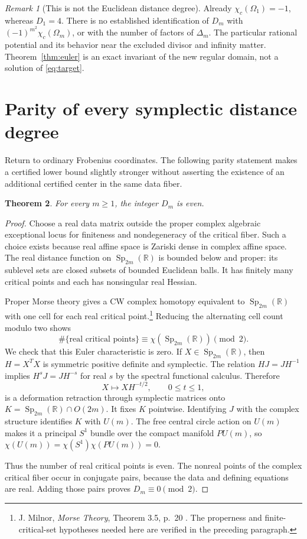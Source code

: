 \documentclass[11pt]{article}
\newtheorem{theorem}{Theorem}[section]
\theoremstyle{remark}\newtheorem{remark}[theorem]{Remark}
\DeclareMathOperator{\Sp}{Sp}
\newcommand{\RR}{\mathbb R}
\begin{document}
\begin{remark}[This is not the Euclidean distance degree]
Already $\chi_c(\Omega_1)=-1$, whereas $D_1=4$. There is no established identification of $D_m$ with $(-1)^{m^2}\chi_c(\Omega_m)$, or with the number of factors of $\Delta_m$. The particular rational potential and its behavior near the excluded divisor and infinity matter. Theorem~\ref{thm:euler} is an exact invariant of the new regular domain, not a solution of \eqref{eq:target}.
\end{remark}

\section{Parity of every symplectic distance degree}\label{sec:parity}
Return to ordinary Frobenius coordinates. The following parity statement makes a certified lower bound slightly stronger without asserting the existence of an additional certified center in the same data fiber.

\begin{theorem}\label{thm:parity}
For every $m\ge1$, the integer $D_m$ is even.
\end{theorem}
\begin{proof}
Choose a real data matrix outside the proper complex algebraic exceptional locus for finiteness and nondegeneracy of the critical fiber. Such a choice exists because real affine space is Zariski dense in complex affine space. The real distance function on $\Sp_{2m}(\RR)$ is bounded below and proper: its sublevel sets are closed subsets of bounded Euclidean balls. It has finitely many critical points and each has nonsingular real Hessian.

Proper Morse theory gives a CW complex homotopy equivalent to $\Sp_{2m}(\RR)$ with one cell for each real critical point.\footnote{J. Milnor, \emph{Morse Theory}, Theorem 3.5, p.~20 \cite{Milnor}. The properness and finite-critical-set hypotheses needed here are verified in the preceding paragraph.} Reducing the alternating cell count modulo two shows
\[
\#\{\text{real critical points}\}\equiv\chi(\Sp_{2m}(\RR))\pmod2.
\]
We check that this Euler characteristic is zero. If $X\in\Sp_{2m}(\RR)$, then $H=X^TX$ is symmetric positive definite and symplectic. The relation $HJ=JH^{-1}$ implies $H^sJ=JH^{-s}$ for real $s$ by the spectral functional calculus. Therefore
\[
X\longmapsto XH^{-t/2},\qquad 0\le t\le1,
\]
is a deformation retraction through symplectic matrices onto $K=\Sp_{2m}(\RR)\cap O(2m)$. It fixes $K$ pointwise. Identifying $J$ with the complex structure identifies $K$ with $U(m)$. The free central circle action on $U(m)$ makes it a principal $S^1$ bundle over the compact manifold $PU(m)$, so $\chi(U(m))=\chi(S^1)\chi(PU(m))=0$.

Thus the number of real critical points is even. The nonreal points of the complex critical fiber occur in conjugate pairs, because the data and defining equations are real. Adding those pairs proves $D_m\equiv0\pmod2$.
\end{proof}
\end{document}
